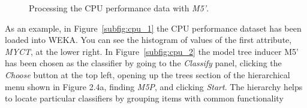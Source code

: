 \begin{figure}[!ht]
\centering
{}
\newline
{}
\caption{\label{fig:cpu_m5}Processing the CPU performance data with \textit{M5'}.}
\end{figure}

As an example, in Figure~\ref{subfig:cpu_1} the CPU performance
dataset has been loaded into WEKA. You can see the histogram of values
of the first attribute, \textit{MYCT}, at the lower right. In
Figure~\ref{subfig:cpu_2} the model tree inducer M5' has been chosen
as the classifier by going to the \textit{Classify} panel, clicking
the \textit{Choose} button at the top left, opening up the trees
section of the hierarchical menu shown in Figure 2.4a, finding
\textit{M5P}, and clicking \textit{Start}. The hierarchy helps to
locate particular classifiers by grouping items with common
functionality

